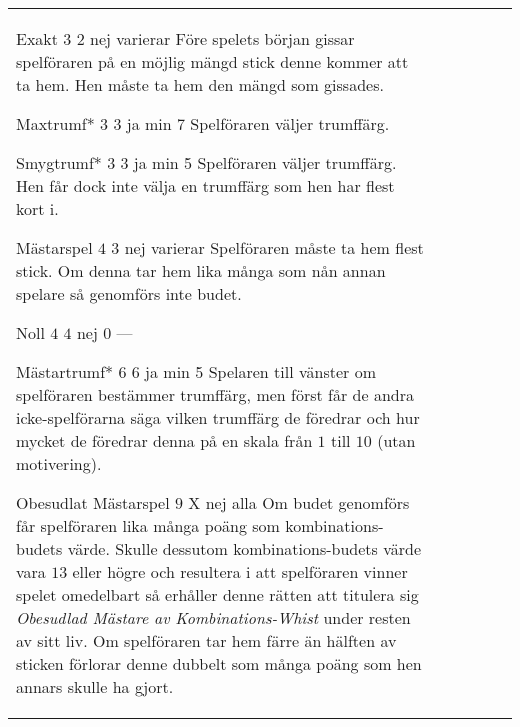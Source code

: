 \begin{table}
\begin{center}
\begin{tabularx}{\textwidth}{lcccc|X}
				\standardBidItem%
				{Exakt}
				{$3$}
				{$2$}
				{nej}
				{varierar}
				{%
					Före spelets början gissar spelföraren på en möjlig mängd stick denne kommer att ta hem. Hen måste ta hem den mängd som gissades.
				}

				\standardBidItem%
				{Maxtrumf*}
				{$3$}
				{$3$}
				{ja}
				{min 7}
				{%
					Spelföraren väljer trumffärg.
				}

				\standardBidItem%
				{Smygtrumf*}
				{$3$}
				{$3$}
				{ja}
				{min 5}
				{%
					Spelföraren väljer trumffärg. Hen får dock inte välja en trumffärg som hen har flest kort i.
				}

				\standardBidItem%
				{Mästarspel}
				{$4$}
				{$3$}
				{nej}
				{varierar}
				{%
					Spelföraren måste ta hem flest stick. Om denna tar hem lika många som nån annan spelare så genomförs inte budet.
				}

				\standardBidItem%
				{Noll}
				{$4$}
				{$4$}
				{nej}
				{0}
				{%
					---
				}

				\standardBidItem%
				{Mästartrumf*}
				{$6$}
				{$6$}
				{ja}
				{min 5}
				{%
					Spelaren till vänster om spelföraren bestämmer trumffärg, men först får de andra icke-spelförarna säga vilken trumffärg de föredrar och hur mycket de föredrar denna på en skala från $1$ till $10$ (utan motivering).
				}

				\standardBidItem%
				{Obesudlat Mästarspel}
				{$9$}
				{X}
				{nej}
				{alla}
				{%
					Om budet genomförs får spelföraren lika många poäng som kombinations-budets värde. Skulle dessutom kombinations-budets värde vara $13$ eller högre och resultera i att spelföraren vinner spelet omedelbart så erhåller denne rätten att titulera sig \emph{Obesudlad Mästare av Kombinations-Whist} under resten av sitt liv. Om spelföraren tar hem färre än hälften av sticken förlorar denne dubbelt som många poäng som hen annars skulle ha gjort.
				}
		\end{tabularx}
	\end{center}
\end{table}
